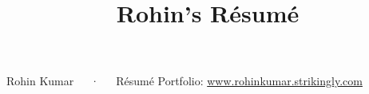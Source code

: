 \documentclass[11pt, a4paper]{awesome-cv}
\title{Rohin's Résumé}
\begin{document}
\makecvheader[L]

\makecvfooter
  {Rohin Kumar~~~·~~~Résumé}
  {Portfolio: \url{www.rohinkumar.strikingly.com}}
  {\thepage}


% 




% 





\newpage



%


\end{document}
